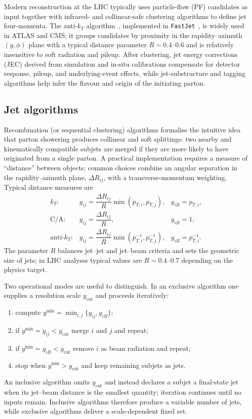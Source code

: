 Modern reconstruction at the LHC typically uses particle-flow (PF) candidates as input together with infrared- and collinear-safe clustering algorithms to define jet four-momenta. The anti-\(k_T\) algorithm~\parencite{Cacciari:2008gp}, implemented in \texttt{FastJet}~\parencite{Cacciari:2011ma}, is widely used in ATLAS and CMS; it groups candidates by proximity in the rapidity–azimuth \((y,\phi)\) plane with a typical distance parameter \(R\sim0.4\)–0.6 and is relatively insensitive to soft radiation and pileup. After clustering, jet energy corrections (JEC) derived from simulation and in-situ calibrations compensate for detector response, pileup, and underlying-event effects, while jet-substructure and tagging algorithms help infer the flavour and origin of the initiating parton.

\subsection{Jet algorithms}

Recombination (or sequential clustering) algorithms formalise the intuitive idea that parton showering produces collinear and soft splittings: two nearby and kinematically compatible subjets are merged if they are more likely to have originated from a single parton. A practical implementation requires a measure of ``distance'' between objects; common choices combine an angular separation in the rapidity–azimuth plane, \(\Delta R_{ij}\), with a transverse-momentum weighting. Typical distance measures are
\[
\begin{array}{lll}
k_T: & y_{ij}=\dfrac{\Delta R_{ij}}{R}\min(p_{T,i},p_{T,j}), & y_{iB}=p_{T,i},\\[6pt]
\mathrm{C/A}: & y_{ij}=\dfrac{\Delta R_{ij}}{R}, & y_{iB}=1,\\[6pt]
\text{anti-}k_T: & y_{ij}=\dfrac{\Delta R_{ij}}{R}\min(p_{T,i}^{-1},p_{T,j}^{-1}), & y_{iB}=p_{T,i}^{-1}.
\end{array}
\]
The parameter \(R\) balances jet–jet and jet–beam criteria and sets the geometric size of jets; in LHC analyses typical values are \(R\sim0.4\text{--}0.7\) depending on the physics target.

Two operational modes are useful to distinguish. In an exclusive algorithm one supplies a resolution scale \(y_{\text{cut}}\) and proceeds iteratively:
\begin{enumerate}
  \item compute \(y^{\min}=\min_{i,j}\{y_{ij},y_{iB}\}\);
  \item if \(y^{\min}=y_{ij}<y_{\text{cut}}\) merge \(i\) and \(j\) and repeat;
  \item if \(y^{\min}=y_{iB}<y_{\text{cut}}\) remove \(i\) as beam radiation and repeat;
  \item stop when \(y^{\min}>y_{\text{cut}}\) and keep remaining subjets as jets.
\end{enumerate}
An inclusive algorithm omits \(y_{\text{cut}}\) and instead declares a subjet a final-state jet when its jet–beam distance is the smallest quantity; iteration continues until no inputs remain. Inclusive algorithms therefore produce a variable number of jets, while exclusive algorithms deliver a scale-dependent fixed set.

